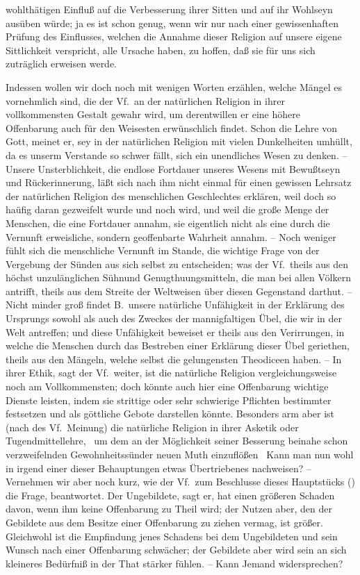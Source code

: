 wohlthätigen Einfluß auf die Verbesserung ihrer Sitten und auf ihr Wohlseyn ausüben würde; ja es ist schon genug, wenn wir nur nach einer gewissenhaften Prüfung des Einflusses, welchen die Annahme dieser Religion auf unsere eigene Sittlichkeit verspricht, alle Ursache haben, zu hoffen, daß sie für uns sich zuträglich erweisen werde. \par
Indessen wollen wir doch noch mit wenigen Worten erzählen, welche Mängel es vornehmlich sind, die der Vf.\ an der natürlichen Religion in ihrer vollkommensten Gestalt gewahr wird, um derentwillen er eine höhere Offenbarung auch für den Weisesten erwünschlich findet. Schon die Lehre von Gott, meinet er, sey in der natürlichen Religion mit vielen Dunkelheiten umhüllt, da es unserm Verstande so schwer fällt, sich ein unendliches Wesen zu denken. -- Unsere Unsterblichkeit, die endlose Fortdauer unseres Wesens mit Bewußtseyn und Rückerinnerung, läßt sich nach ihm nicht einmal für  einen gewissen Lehrsatz der natürlichen Religion des menschlichen Geschlechtes erklären, weil doch so haüfig daran gezweifelt wurde und noch wird, und weil die große Menge der Menschen, die eine Fortdauer annahm, sie eigentlich nicht als eine durch die Vernunft erweisliche, sondern geoffenbarte Wahrheit annahm. -- Noch weniger fühlt sich die menschliche Vernunft im Stande, die wichtige Frage von der Vergebung der Sünden aus sich selbst zu entscheiden; was der Vf.\ theils aus den höchst unzulänglichen Sühnund Genugthuungsmitteln, die man bei allen Völkern antrifft, theils aus dem Streite der Weltweisen über diesen Gegenstand darthut. -- Nicht minder groß findet B.\ unsere natürliche Unfähigkeit in der Erklärung des Ursprungs sowohl als auch des Zweckes der mannigfaltigen Übel, die wir in der Welt antreffen; und diese Unfähigkeit beweiset er theils aus den Verirrungen, in welche die Menschen durch das Bestreben einer Erklärung dieser Übel geriethen, theils aus den Mängeln, welche selbst die gelungensten Theodiceen haben. -- In ihrer Ethik, sagt der Vf.\ weiter, ist die natürliche Religion vergleichungsweise noch am Vollkommensten; doch könnte auch hier eine Offenbarung wichtige Dienste leisten, indem sie strittige oder sehr schwierige Pflichten bestimmter festsetzen und als göttliche Gebote darstellen könnte. Besonders arm aber ist (nach des Vf.\ Meinung) die natürliche Religion in ihrer Asketik oder Tugendmittellehre, \zB\ um dem an der Möglichkeit seiner Besserung beinahe schon verzweifelnden Gewohnheitssünder neuen Muth einzuflößen \usw\ Kann man nun wohl in irgend einer dieser Behauptungen etwas Übertriebenes nachweisen? -- Vernehmen wir aber noch kurz, wie der Vf.\ zum Beschlusse dieses Hauptstücks () die Frage,  beantwortet. Der Ungebildete, sagt er, hat einen größeren Schaden davon, wenn ihm keine Offenbarung zu Theil wird; der Nutzen aber, den der Gebildete aus dem Besitze einer Offenbarung zu ziehen vermag, ist größer. Gleichwohl ist die Empfindung jenes Schadens bei dem Ungebildeten und  sein Wunsch nach einer Offenbarung schwächer; der Gebildete aber wird sein an sich kleineres Bedürfniß in der That stärker fühlen. -- Kann Jemand widersprechen? \par
